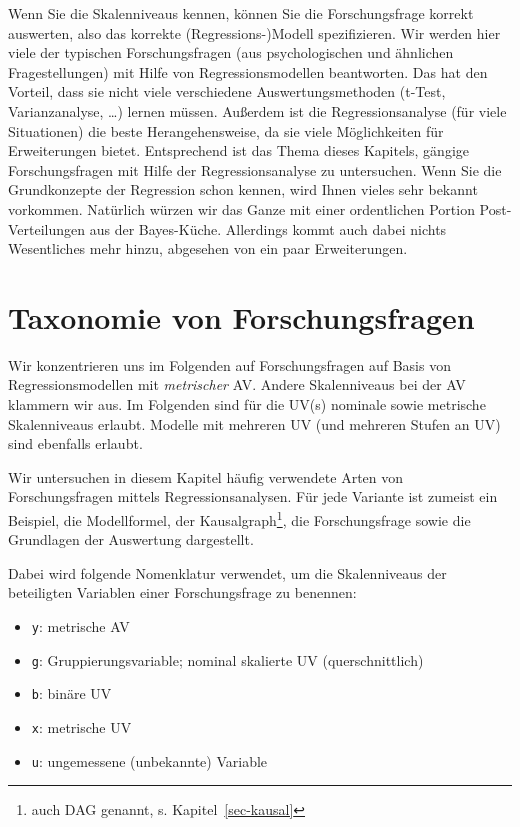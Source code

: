 \documentclass[
  ngerman,
  letterpaper,
  twoside,
  open=any]{scrbook}
\providecommand{\tightlist}{%
  \setlength{\itemsep}{0pt}\setlength{\parskip}{0pt}}\usepackage{longtable,booktabs,array}
\theoremstyle{definition}
\theoremstyle{plain}
\theoremstyle{definition}
\theoremstyle{definition}
\theoremstyle{definition}
\theoremstyle{definition}
\theoremstyle{remark}
\begin{document}
Wenn Sie die Skalenniveaus kennen, können Sie die Forschungsfrage
korrekt auswerten, also das korrekte (Regressions-)Modell spezifizieren.
Wir werden hier viele der typischen Forschungsfragen (aus
psychologischen und ähnlichen Fragestellungen) mit Hilfe von
Regressionsmodellen beantworten. Das hat den Vorteil, dass sie nicht
viele verschiedene Auswertungsmethoden (t-Test, Varianzanalyse, \ldots)
lernen müssen. Außerdem ist die Regressionsanalyse (für viele
Situationen) die beste Herangehensweise, da sie viele Möglichkeiten für
Erweiterungen bietet. Entsprechend ist das Thema dieses Kapitels,
gängige Forschungsfragen mit Hilfe der Regressionsanalyse zu
untersuchen. Wenn Sie die Grundkonzepte der Regression schon kennen,
wird Ihnen vieles sehr bekannt vorkommen. Natürlich würzen wir das Ganze
mit einer ordentlichen Portion Post-Verteilungen aus der Bayes-Küche.
Allerdings kommt auch dabei nichts Wesentliches mehr hinzu, abgesehen
von ein paar Erweiterungen.

\section{Taxonomie von
Forschungsfragen}\label{taxonomie-von-forschungsfragen}

Wir konzentrieren uns im Folgenden auf Forschungsfragen auf Basis von
Regressionsmodellen mit \emph{metrischer} AV. Andere Skalenniveaus bei
der AV klammern wir aus. Im Folgenden sind für die UV(s) nominale sowie
metrische Skalenniveaus erlaubt. Modelle mit mehreren UV (und mehreren
Stufen an UV) sind ebenfalls erlaubt.

Wir untersuchen in diesem Kapitel häufig verwendete Arten von
Forschungsfragen mittels Regressionsanalysen. Für jede Variante ist
zumeist ein Beispiel, die Modellformel, der Kausalgraph\footnote{auch
  DAG genannt, s. Kapitel~\ref{sec-kausal}}, die Forschungsfrage sowie
die Grundlagen der Auswertung dargestellt.

Dabei wird folgende Nomenklatur verwendet, um die Skalenniveaus der
beteiligten Variablen einer Forschungsfrage zu benennen:

\begin{itemize}
\tightlist
\item
  \texttt{y}: metrische AV
\item
  \texttt{g}: Gruppierungsvariable; nominal skalierte UV
  (querschnittlich)
\item
  \texttt{b}: binäre UV
\item
  \texttt{x}: metrische UV
\item
  \texttt{u}: ungemessene (unbekannte) Variable
\end{itemize}
\end{document}
